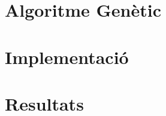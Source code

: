 \documentclass[titlepage,a4paper,12pt]{book}
\begin{document}

\section{Algoritme Genètic} %
	\label{sec:Algoritme Genetic}

\section{Implementació} %
	\label{sec:Implementacio}

\section{Resultats} %
	\label{sec:Resultats}
	
\end{document}
